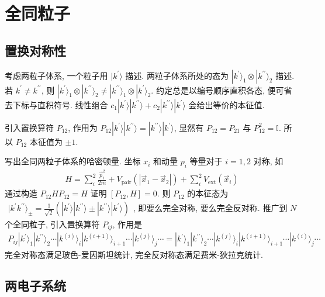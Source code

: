 \documentclass[../../main.tex]{subfiles}
\begin{document}
\section{全同粒子}
\subsection{置换对称性}

考虑两粒子体系, 一个粒子用 $|k^{\prime}\rangle$ 描述. 两粒子体系所处的态为 $|k^{\prime}\rangle_{1}\otimes |k^{\prime\prime}\rangle_{2}$ 描述. 若 $k^{\prime}\neq k^{\prime\prime}$, 则 $|k^{\prime}\rangle_{1}\otimes |k^{\prime\prime}\rangle_{2}\neq |k^{\prime\prime}\rangle_{1}\otimes |k^{\prime}\rangle_{2}$. 约定总是以编号顺序直积各态, 便可省去下标与直积符号. 线性组合 $c_{1}|k^{\prime}\rangle|k^{\prime\prime}\rangle + c_{2}|k^{\prime\prime}\rangle|k^{\prime}\rangle$ 会给出等价的本征值.

引入置换算符 $P_{12}$, 作用为 $P_{12}|k^{\prime}\rangle|k^{\prime\prime}\rangle = |k^{\prime\prime}\rangle|k^{\prime}\rangle$, 显然有 $P_{12} = P_{21}$ 与 $P_{12}^{2} = \mathbb{I}$. 所以 $P_{12}$ 本征值为 $\pm 1$. 

写出全同两粒子体系的哈密顿量. 坐标 $x_{i}$ 和动量 $p_{i}$ 等量对于 $i=1,2$ 对称, 如
\begin{align*}
  H = \sum_{i}^{2}\frac{\vec{p}_{i}^{2}}{2m} + V_{\text{pair}}(|\vec{x}_{1} - \vec{x}_{2}|) + \sum_{i}^{2}V_{\text{ext}}(\vec{x}_{i})
\end{align*}
通过构造 $P_{12}HP_{12} = H$ 证明 $[P_{12},H]=0$. 则 $P_{12}$ 的本征态为 $\begin{aligned}
  |k^{\prime}k^{\prime\prime}\rangle_{\pm} = \frac{1}{\sqrt{2}}(|k^{\prime}\rangle|k^{\prime\prime}\rangle\pm|k^{\prime\prime}\rangle|k^{\prime}\rangle)
\end{aligned}$, 即要么完全对称, 要么完全反对称. 推广到 $N$ 个全同粒子, 引入置换算符 $P_{ij}$, 作用是
\begin{align*}
  P_{ij}|k^{\prime}\rangle_{1}|k^{\prime\prime}\rangle_{2}\cdots|k^{(i)}\rangle_{i}|k^{(i+1)}\rangle_{i+1}\cdots|k^{(j)}\rangle_{j}\cdots = |k^{\prime}\rangle_{1}|k^{\prime\prime}\rangle_{2}\cdots|k^{(j)}\rangle_{i}|k^{(i+1)}\rangle_{i+1}\cdots|k^{(i)}\rangle_{j}\cdots
\end{align*}
完全对称态满足玻色-爱因斯坦统计, 完全反对称态满足费米-狄拉克统计.

\subsection{两电子系统}
\end{document}
